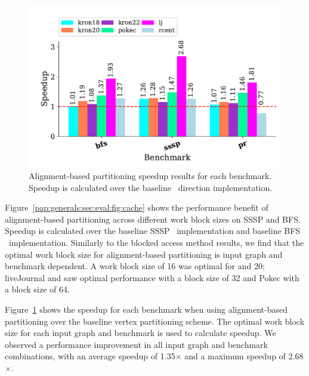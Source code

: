 \begin{figure}[!ht]
    \centering
    \includegraphics[scale = 0.65]{graphit-figures/align.pdf}
    \caption{Alignment-based partitioning speedup results for each benchmark. Speedup is calculated over the baseline \pull~direction implementation.} %
    \label{pap:generals:sec:eval:fig:aligned}
\end{figure}
 
Figure~\ref{pap:generals:sec:eval:fig:cache} shows the performance benefit of alignment-based partitioning across different work block sizes on SSSP and BFS.
Speedup is calculated over the baseline SSSP \pull~implementation and baseline BFS \pull~implementation. 
Similarly to the blocked access method results, we find that the optimal work block size for alignment-based partitioning is input graph and benchmark dependent. 
A work block size of 16 was optimal for  and 20; liveJournal and  saw optimal performance with a block size of 32 and Pokec with a block size of 64.

Figure~\ref{pap:generals:sec:eval:fig:aligned} shows the speedup for each benchmark when using alignment-based partitioning over the baseline vertex partitioning scheme. 
The optimal work block size for each input graph and benchmark is used to calculate speedup. 
We observed a performance improvement in all input graph and benchmark combinations, with an average speedup of 1.35$\times$ and a maximum speedup of 2.68$\times$. 
 
